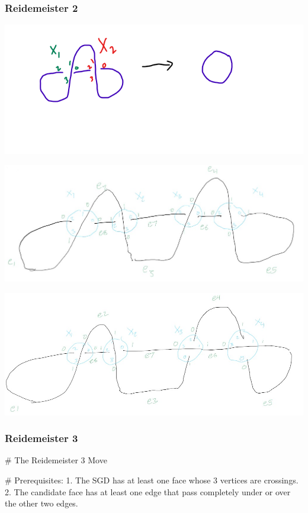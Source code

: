 \subsubsection{Reidemeister 2}

\includegraphics[scale=0.5]{test_spatial_graph_diagrams/images/r2_1}

\includegraphics[scale=0.5]{test_spatial_graph_diagrams/images/r2_double_loop_same}

\includegraphics[scale=0.5]{test_spatial_graph_diagrams/images/r2_double_loop_opposite}



\subsubsection{Reidemeister 3}

# The Reidemeister 3 Move

# Prerequisites:
1. The SGD has at least one face whose 3 vertices are crossings.
2. The candidate face has at least one edge that pass completely under or over the other two edges.



